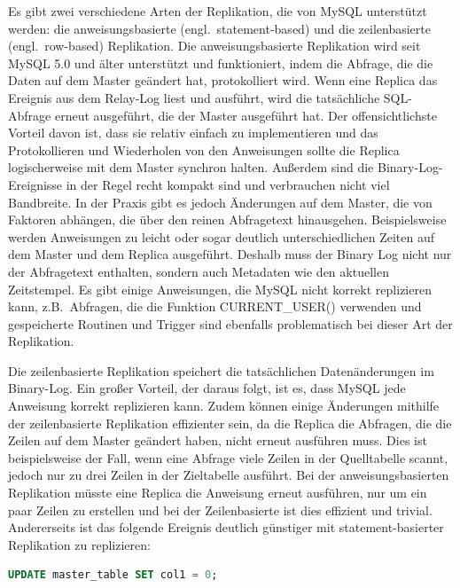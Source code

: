 Es gibt zwei verschiedene Arten der Replikation, die von MySQL unterstützt werden: die anweisungsbasierte (engl.\ statement-based) und die zeilenbasierte (engl.\ row-based) Replikation.
Die anweisungsbasierte Replikation wird seit MySQL 5.0 und älter unterstützt und funktioniert, indem die Abfrage, die die Daten auf dem Master geändert hat, protokolliert wird.
Wenn eine Replica das Ereignis aus dem Relay-Log liest und ausführt, wird die tatsächliche SQL-Abfrage erneut ausgeführt, die der Master ausgeführt hat.
Der offensichtlichste Vorteil davon ist, dass sie relativ einfach zu implementieren und das Protokollieren und Wiederholen von den Anweisungen sollte die Replica logischerweise mit dem Master synchron halten.
Außerdem sind die Binary-Log-Ereignisse in der Regel recht kompakt sind und verbrauchen nicht viel Bandbreite.
In der Praxis gibt es jedoch Änderungen auf dem Master, die von Faktoren abhängen, die über den reinen Abfragetext hinausgehen.
Beispielsweise werden Anweisungen zu leicht oder sogar deutlich unterschiedlichen Zeiten auf dem Master und dem Replica ausgeführt.
Deshalb muss der Binary Log nicht nur der Abfragetext enthalten, sondern auch Metadaten wie den aktuellen Zeitstempel.
Es gibt einige Anweisungen, die MySQL nicht korrekt replizieren kann, z.B.\ Abfragen, die die Funktion CURRENT\_USER() verwenden und gespeicherte Routinen und Trigger sind ebenfalls problematisch bei dieser Art der Replikation.

Die zeilenbasierte Replikation speichert die tatsächlichen Datenänderungen im Binary-Log.
Ein großer Vorteil, der daraus folgt, ist es, dass MySQL jede Anweisung korrekt replizieren kann.
Zudem können einige Änderungen mithilfe der zeilenbasierte Replikation effizienter sein, da die Replica die Abfragen, die die Zeilen auf dem Master geändert haben, nicht erneut ausführen muss.
Dies ist beispielsweise der Fall, wenn eine Abfrage viele Zeilen in der Quelltabelle scannt, jedoch nur zu drei Zeilen in der Zieltabelle ausführt.
Bei der anweisungsbasierten Replikation müsste eine Replica die Anweisung erneut ausführen, nur um ein paar Zeilen zu erstellen und bei der Zeilenbasierte ist dies effizient und trivial.
Andererseits ist das folgende Ereignis deutlich günstiger mit statement-basierter Replikation zu replizieren:

\vspace{-5pt}
\begin{lstlisting}[language=SQL,caption=Update-Befehl auf dem Master,label={lst:repl_update_command}]
UPDATE master_table SET col1 = 0;
\end{lstlisting}
\vspace{-5pt}


